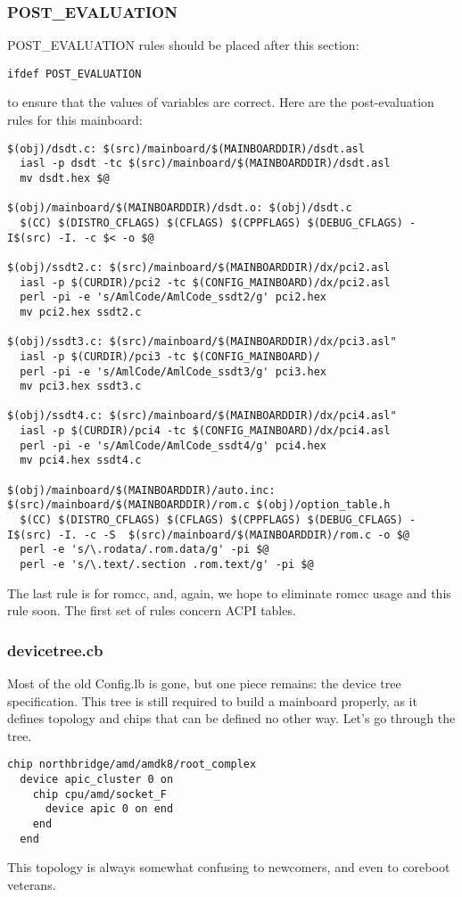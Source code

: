 \documentclass[10pt,letterpaper]{article}
\begin{document}
\subsubsection{POST\_EVALUATION}
POST\_EVALUATION rules should be placed after this section:
\begin{verbatim}
ifdef POST_EVALUATION
\end{verbatim}
to ensure that the values of variables are correct.
Here are the post-evaluation rules for this mainboard:
\begin{verbatim}
$(obj)/dsdt.c: $(src)/mainboard/$(MAINBOARDDIR)/dsdt.asl
  iasl -p dsdt -tc $(src)/mainboard/$(MAINBOARDDIR)/dsdt.asl
  mv dsdt.hex $@

$(obj)/mainboard/$(MAINBOARDDIR)/dsdt.o: $(obj)/dsdt.c
  $(CC) $(DISTRO_CFLAGS) $(CFLAGS) $(CPPFLAGS) $(DEBUG_CFLAGS) -I$(src) -I. -c $< -o $@

$(obj)/ssdt2.c: $(src)/mainboard/$(MAINBOARDDIR)/dx/pci2.asl
  iasl -p $(CURDIR)/pci2 -tc $(CONFIG_MAINBOARD)/dx/pci2.asl
  perl -pi -e 's/AmlCode/AmlCode_ssdt2/g' pci2.hex
  mv pci2.hex ssdt2.c

$(obj)/ssdt3.c: $(src)/mainboard/$(MAINBOARDDIR)/dx/pci3.asl"
  iasl -p $(CURDIR)/pci3 -tc $(CONFIG_MAINBOARD)/
  perl -pi -e 's/AmlCode/AmlCode_ssdt3/g' pci3.hex
  mv pci3.hex ssdt3.c

$(obj)/ssdt4.c: $(src)/mainboard/$(MAINBOARDDIR)/dx/pci4.asl"
  iasl -p $(CURDIR)/pci4 -tc $(CONFIG_MAINBOARD)/dx/pci4.asl
  perl -pi -e 's/AmlCode/AmlCode_ssdt4/g' pci4.hex
  mv pci4.hex ssdt4.c

$(obj)/mainboard/$(MAINBOARDDIR)/auto.inc: $(src)/mainboard/$(MAINBOARDDIR)/rom.c $(obj)/option_table.h
  $(CC) $(DISTRO_CFLAGS) $(CFLAGS) $(CPPFLAGS) $(DEBUG_CFLAGS) -I$(src) -I. -c -S  $(src)/mainboard/$(MAINBOARDDIR)/rom.c -o $@
  perl -e 's/\.rodata/.rom.data/g' -pi $@
  perl -e 's/\.text/.section .rom.text/g' -pi $@

\end{verbatim}
The last rule is for romcc, and, again, we hope to eliminate romcc usage and this rule soon. The first set of rules concern ACPI tables.
\subsubsection{devicetree.cb}
Most of the old Config.lb is gone, but one piece remains: the device tree specification. This tree is still required to build a mainboard
properly, as it defines topology and chips that can be defined no other way.
Let's go through the tree.
\begin{verbatim}
chip northbridge/amd/amdk8/root_complex
  device apic_cluster 0 on
    chip cpu/amd/socket_F
      device apic 0 on end
    end
  end
\end{verbatim}
This topology is always somewhat confusing to newcomers, and even to coreboot veterans.
\end{document}
